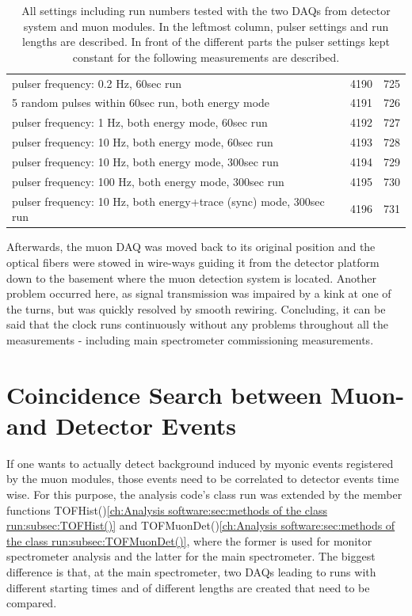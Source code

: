 \begin{table}
\begin{tabularx}{0.9 \textwidth}{|X|cc|}
		\hline
		pulser frequency: 0.2 Hz, 60sec run & 4190 & 725 \\
		5 random pulses within 60sec run, both energy mode & 4191 & 726 \\
		pulser frequency: 1 Hz, both energy mode, 60sec run & 4192 & 727 \\
		pulser frequency: 10 Hz, both energy mode, 60sec run & 4193 & 728 \\
		pulser frequency: 10 Hz, both energy mode, 300sec run & 4194 & 729 \\
		pulser frequency: 100 Hz, both energy mode, 300sec run & 4195 & 730 \\
		pulser frequency: 10 Hz, both energy+trace (sync) mode, 300sec run & 4196 & 731 \\
  		\hline
  	\end{tabularx}
	\caption[Synchronisation test Settings]{All settings including run numbers tested with the two DAQs from detector system and muon modules. In the leftmost column, pulser settings and run lengths are described. In front of the different parts the pulser settings kept constant for the following measurements are described.}
	\label{tab:syncTests}
  \end{table}

  Afterwards, the muon DAQ was moved back to its original position and the optical fibers were stowed in wire-ways guiding it from the detector platform down to the basement where the muon detection system is located. Another problem occurred here, as signal transmission was impaired by a kink at one of the turns, but was quickly resolved by smooth rewiring.
  Concluding, it can be said that the clock runs continuously without any problems throughout all the measurements - including main spectrometer commissioning measurements.

  
  \section{Coincidence Search between Muon- and Detector Events}
  \label{ch:Analysis:sec:Monitor Spectrometer Measurements}
  If one wants to actually detect background induced by myonic events registered by the muon modules, those events need to be correlated to detector events time wise. For this purpose, the analysis code's class run was extended by the member functions TOFHist()\ref{ch:Analysis software:sec:methods of the class run:subsec:TOFHist()} and TOFMuonDet()\ref{ch:Analysis software:sec:methods of the class run:subsec:TOFMuonDet()}, where the former is used for monitor spectrometer analysis and the latter for the main spectrometer. The biggest difference is that, at the main spectrometer, two DAQs leading to runs with different starting times and of different lengths are created that need to be compared. 
  
